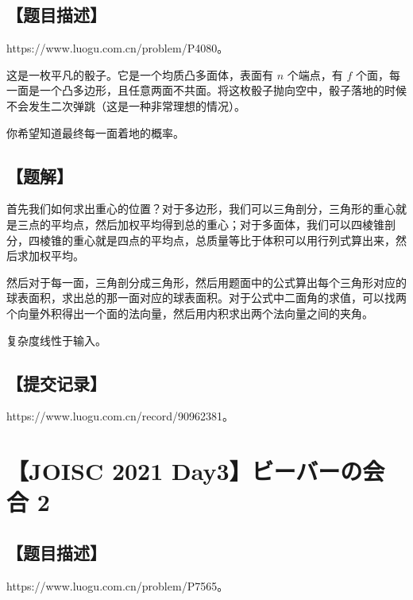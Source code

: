 \documentclass[UTF8,12pt,a4paper]{ctexart}
\begin{document}
	\subsection*{【题目描述】}
	
	https://www.luogu.com.cn/problem/P4080。
	
	这是一枚平凡的骰子。它是一个均质凸多面体，表面有 $n$ 个端点，有 $f$ 个面，每一面是一个凸多边形，且任意两面不共面。将这枚骰子抛向空中，骰子落地的时候不会发生二次弹跳（这是一种非常理想的情况）。
	
	你希望知道最终每一面着地的概率。
	
	\subsection*{【题解】}
	
	首先我们如何求出重心的位置？对于多边形，我们可以三角剖分，三角形的重心就是三点的平均点，然后加权平均得到总的重心；对于多面体，我们可以四棱锥剖分，四棱锥的重心就是四点的平均点，总质量等比于体积可以用行列式算出来，然后求加权平均。
	
	然后对于每一面，三角剖分成三角形，然后用题面中的公式算出每个三角形对应的球表面积，求出总的那一面对应的球表面积。对于公式中二面角的求值，可以找两个向量外积得出一个面的法向量，然后用内积求出两个法向量之间的夹角。
	
	复杂度线性于输入。
	
	\subsection*{【提交记录】}
	
	https://www.luogu.com.cn/record/90962381。
	
	
	\section*{【JOISC 2021 Day3】ビーバーの会合 2}
	
	\subsection*{【题目描述】}
	
	https://www.luogu.com.cn/problem/P7565。
	
\end{document}

